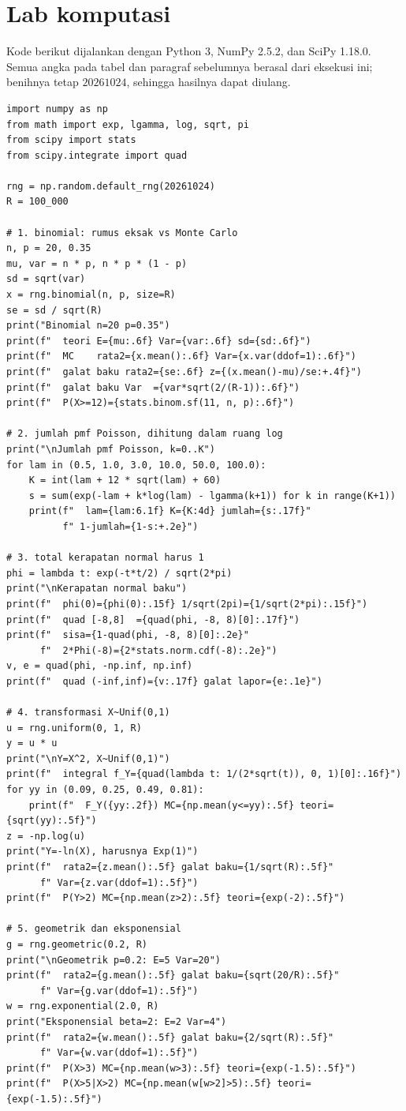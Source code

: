 \section{Lab komputasi}

Kode berikut dijalankan dengan Python 3, NumPy 2.5.2, dan SciPy 1.18.0. Semua angka
pada tabel dan paragraf sebelumnya berasal dari eksekusi ini; benihnya tetap
$20261024$, sehingga hasilnya dapat diulang.

\begin{lab}
\begin{verbatim}
import numpy as np
from math import exp, lgamma, log, sqrt, pi
from scipy import stats
from scipy.integrate import quad

rng = np.random.default_rng(20261024)
R = 100_000

# 1. binomial: rumus eksak vs Monte Carlo
n, p = 20, 0.35
mu, var = n * p, n * p * (1 - p)
sd = sqrt(var)
x = rng.binomial(n, p, size=R)
se = sd / sqrt(R)
print("Binomial n=20 p=0.35")
print(f"  teori E={mu:.6f} Var={var:.6f} sd={sd:.6f}")
print(f"  MC    rata2={x.mean():.6f} Var={x.var(ddof=1):.6f}")
print(f"  galat baku rata2={se:.6f} z={(x.mean()-mu)/se:+.4f}")
print(f"  galat baku Var  ={var*sqrt(2/(R-1)):.6f}")
print(f"  P(X>=12)={stats.binom.sf(11, n, p):.6f}")

# 2. jumlah pmf Poisson, dihitung dalam ruang log
print("\nJumlah pmf Poisson, k=0..K")
for lam in (0.5, 1.0, 3.0, 10.0, 50.0, 100.0):
    K = int(lam + 12 * sqrt(lam) + 60)
    s = sum(exp(-lam + k*log(lam) - lgamma(k+1)) for k in range(K+1))
    print(f"  lam={lam:6.1f} K={K:4d} jumlah={s:.17f}"
          f" 1-jumlah={1-s:+.2e}")

# 3. total kerapatan normal harus 1
phi = lambda t: exp(-t*t/2) / sqrt(2*pi)
print("\nKerapatan normal baku")
print(f"  phi(0)={phi(0):.15f} 1/sqrt(2pi)={1/sqrt(2*pi):.15f}")
print(f"  quad [-8,8]  ={quad(phi, -8, 8)[0]:.17f}")
print(f"  sisa={1-quad(phi, -8, 8)[0]:.2e}"
      f"  2*Phi(-8)={2*stats.norm.cdf(-8):.2e}")
v, e = quad(phi, -np.inf, np.inf)
print(f"  quad (-inf,inf)={v:.17f} galat lapor={e:.1e}")

# 4. transformasi X~Unif(0,1)
u = rng.uniform(0, 1, R)
y = u * u
print("\nY=X^2, X~Unif(0,1)")
print(f"  integral f_Y={quad(lambda t: 1/(2*sqrt(t)), 0, 1)[0]:.16f}")
for yy in (0.09, 0.25, 0.49, 0.81):
    print(f"  F_Y({yy:.2f}) MC={np.mean(y<=yy):.5f} teori={sqrt(yy):.5f}")
z = -np.log(u)
print("Y=-ln(X), harusnya Exp(1)")
print(f"  rata2={z.mean():.5f} galat baku={1/sqrt(R):.5f}"
      f" Var={z.var(ddof=1):.5f}")
print(f"  P(Y>2) MC={np.mean(z>2):.5f} teori={exp(-2):.5f}")

# 5. geometrik dan eksponensial
g = rng.geometric(0.2, R)
print("\nGeometrik p=0.2: E=5 Var=20")
print(f"  rata2={g.mean():.5f} galat baku={sqrt(20/R):.5f}"
      f" Var={g.var(ddof=1):.5f}")
w = rng.exponential(2.0, R)
print("Eksponensial beta=2: E=2 Var=4")
print(f"  rata2={w.mean():.5f} galat baku={2/sqrt(R):.5f}"
      f" Var={w.var(ddof=1):.5f}")
print(f"  P(X>3) MC={np.mean(w>3):.5f} teori={exp(-1.5):.5f}")
print(f"  P(X>5|X>2) MC={np.mean(w[w>2]>5):.5f} teori={exp(-1.5):.5f}")
\end{verbatim}
\end{lab}

